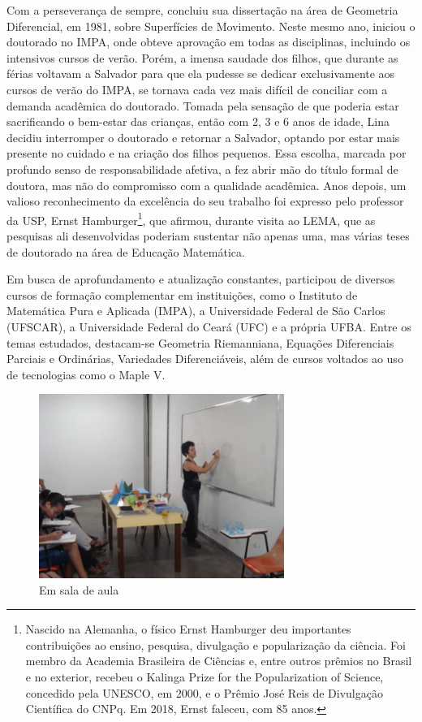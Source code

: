 \documentclass{hipatia}
\begin{document}
Com a perseverança de sempre, concluiu  sua dissertação na área de Geometria Diferencial, em 1981, sobre Superfícies de Movimento. Neste mesmo ano, iniciou o doutorado no IMPA, onde obteve aprovação em todas as disciplinas, incluindo os intensivos cursos de verão. Porém, a imensa saudade dos filhos, que durante as férias voltavam a Salvador para que ela pudesse se dedicar exclusivamente aos cursos de verão do IMPA, se tornava cada vez mais difícil de conciliar com a demanda acadêmica do doutorado. Tomada pela sensação de que poderia estar sacrificando o bem-estar das crianças, então com 2, 3 e 6 anos de idade, Lina decidiu interromper o doutorado e retornar a Salvador, optando por estar mais presente no cuidado e na criação dos filhos pequenos. Essa escolha, marcada por profundo senso de responsabilidade afetiva, a fez abrir mão do título formal de doutora, mas não do compromisso com a qualidade acadêmica.
Anos depois, um valioso reconhecimento da excelência do seu trabalho foi expresso pelo professor da USP, Ernst Hamburger\footnote{Nascido na Alemanha, o físico Ernst Hamburger deu importantes contribuições ao ensino, pesquisa, divulgação e popularização da ciência. Foi membro da Academia Brasileira de Ciências e, entre outros prêmios no Brasil e no exterior, recebeu o Kalinga Prize for the Popularization of Science, concedido pela UNESCO, em 2000, e o Prêmio José Reis de Divulgação Científica do CNPq. Em 2018, Ernst faleceu, com 85 anos.}, que afirmou, durante visita ao LEMA, que as pesquisas ali desenvolvidas poderiam sustentar não apenas uma, mas várias teses de doutorado na área de Educação Matemática.  

Em busca de aprofundamento e atualização constantes, participou de diversos cursos de formação complementar em instituições, como o Instituto de Matemática Pura e Aplicada (IMPA), a Universidade Federal de São Carlos (UFSCAR), a Universidade Federal do Ceará (UFC) e a própria UFBA. Entre os temas estudados, destacam-se Geometria Riemanniana, Equações Diferenciais Parciais e Ordinárias, Variedades Diferenciáveis, além de cursos voltados ao uso de tecnologias como o Maple V. 


\begin{figure}[htb!]
\includegraphics[width=8cm]{Lina em sala de aula.jpg}
\caption{Em sala de aula}   
\end{figure}
\end{document}
